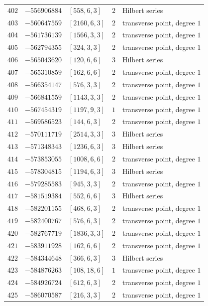 \documentclass[11pt]{article}
\begin{document}
\begin{center}
\begin{longtable}{r r l c l}
$402$ & $-556906884$ & $[558,6,3]$ & $2$ & Hilbert series\\
$403$ & $-560647559$ & $[2160,6,3]$ & $2$ & transverse point, degree $1$\\
$404$ & $-561736139$ & $[1566,3,3]$ & $2$ & transverse point, degree $1$\\
$405$ & $-562794355$ & $[324,3,3]$ & $2$ & transverse point, degree $1$\\
$406$ & $-565043620$ & $[120,6,6]$ & $3$ & Hilbert series\\
$407$ & $-565310859$ & $[162,6,6]$ & $2$ & transverse point, degree $1$\\
$408$ & $-566354147$ & $[576,3,3]$ & $2$ & transverse point, degree $1$\\
$409$ & $-566841559$ & $[1143,3,3]$ & $2$ & transverse point, degree $1$\\
$410$ & $-567454319$ & $[1197,9,3]$ & $1$ & transverse point, degree $1$\\
$411$ & $-569586523$ & $[144,6,3]$ & $2$ & transverse point, degree $1$\\
$412$ & $-570111719$ & $[2514,3,3]$ & $3$ & Hilbert series\\
$413$ & $-571348343$ & $[1236,6,3]$ & $3$ & Hilbert series\\
$414$ & $-573853055$ & $[1008,6,6]$ & $2$ & transverse point, degree $1$\\
$415$ & $-578304815$ & $[1194,6,3]$ & $3$ & Hilbert series\\
$416$ & $-579285583$ & $[945,3,3]$ & $2$ & transverse point, degree $1$\\
$417$ & $-581519384$ & $[552,6,6]$ & $3$ & Hilbert series\\
$418$ & $-582201155$ & $[468,6,3]$ & $2$ & transverse point, degree $1$\\
$419$ & $-582400767$ & $[576,6,3]$ & $2$ & transverse point, degree $1$\\
$420$ & $-582767719$ & $[1836,3,3]$ & $2$ & transverse point, degree $1$\\
$421$ & $-583911928$ & $[162,6,6]$ & $2$ & transverse point, degree $1$\\
$422$ & $-584344648$ & $[366,6,3]$ & $3$ & Hilbert series\\
$423$ & $-584876263$ & $[108,18,6]$ & $1$ & transverse point, degree $1$\\
$424$ & $-584926724$ & $[612,6,3]$ & $2$ & transverse point, degree $1$\\
$425$ & $-586070587$ & $[216,3,3]$ & $2$ & transverse point, degree $1$\\

\end{longtable}
\end{center}
\end{document}
